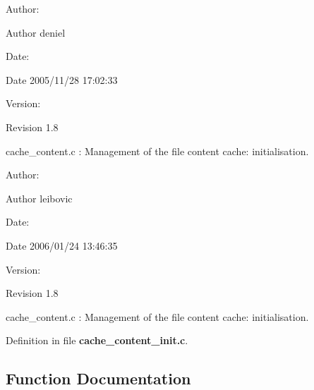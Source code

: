 \begin{Desc}
\item[Author:]\end{Desc}
\begin{Desc}
\item[Author]deniel \end{Desc}
\begin{Desc}
\item[Date:]\end{Desc}
\begin{Desc}
\item[Date]2005/11/28 17:02:33 \end{Desc}
\begin{Desc}
\item[Version:]\end{Desc}
\begin{Desc}
\item[Revision]1.8 \end{Desc}
cache\_\-content.c : Management of the file content cache: initialisation.

\begin{Desc}
\item[Author:]\end{Desc}
\begin{Desc}
\item[Author]leibovic \end{Desc}
\begin{Desc}
\item[Date:]\end{Desc}
\begin{Desc}
\item[Date]2006/01/24 13:46:35 \end{Desc}
\begin{Desc}
\item[Version:]\end{Desc}
\begin{Desc}
\item[Revision]1.8 \end{Desc}
cache\_\-content.c : Management of the file content cache: initialisation. 

Definition in file {\bf cache\_\-content\_\-init.c}.

\subsection{Function Documentation}

